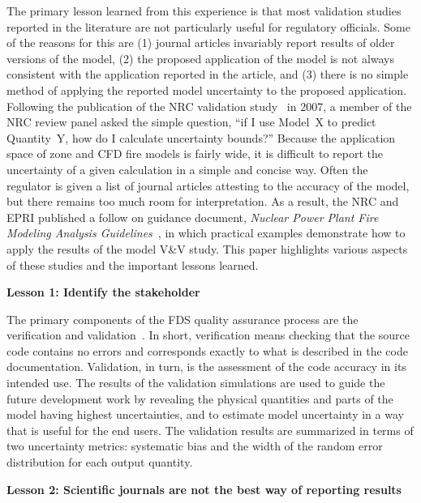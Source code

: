 \documentclass[fleqn,b5paper]{article}
\begin{document}
The primary lesson learned from this experience is that most validation studies reported in the literature are not particularly useful for regulatory officials. Some of the reasons for this are (1) journal articles invariably report results of older versions of the model, (2) the proposed application of the model is not always consistent with the application reported in the article, and (3) there is no simple method of applying the reported model uncertainty to the proposed application. Following the publication of the NRC validation study~\cite{NUREG_1824} in 2007, a member of the NRC review panel asked the simple question, ``if I use Model~X to predict Quantity~Y, how do I calculate uncertainty bounds?'' Because the application space of zone and CFD fire models is fairly wide, it is difficult to report the uncertainty of a given calculation in a simple and concise way. Often the regulator is given a list of journal articles attesting to the accuracy of the model, but there remains too much room for interpretation. As a result, the NRC and EPRI published a follow on guidance document, {\em Nuclear Power Plant Fire Modeling Analysis Guidelines}~\cite{NUREG_1934}, in which practical examples demonstrate how to apply the results of the model V\&V study. This paper highlights various aspects of these studies and the important lessons learned.


\vspace{\parskip}
{\bf Lesson 1: Identify the stakeholder}



The primary components of the FDS quality assurance process are the verification and validation~\cite{ASTM:E1355}. In short, verification means checking that the source code contains no errors and corresponds exactly to what is described in the code documentation. Validation, in turn, is the assessment of the code accuracy in its intended use. The results of the validation simulations are used to guide the future development work by revealing the physical quantities and parts of the model having highest uncertainties, and to estimate model uncertainty in a way that is useful for the end users. The validation results are summarized in terms of two uncertainty metrics: systematic bias and the width of the random error distribution for each output quantity.



\vspace{\parskip}
{\bf Lesson 2: Scientific journals are not the best way of reporting results}
\end{document}
